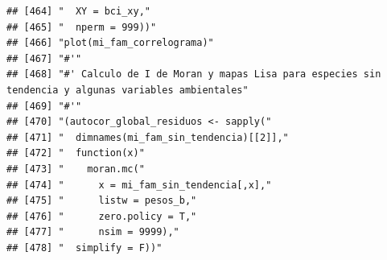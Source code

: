 \documentclass[11pt,]{article}
\begin{document}
\begin{verbatim}
## [464] "  XY = bci_xy,"                                                                                                                                                        
## [465] "  nperm = 999))"                                                                                                                                                       
## [466] "plot(mi_fam_correlograma)"                                                                                                                                             
## [467] "#'"                                                                                                                                                                    
## [468] "#' Calculo de I de Moran y mapas Lisa para especies sin tendencia y algunas variables ambientales"                                                                     
## [469] "#'"                                                                                                                                                                    
## [470] "(autocor_global_residuos <- sapply("                                                                                                                                   
## [471] "  dimnames(mi_fam_sin_tendencia)[[2]],"                                                                                                                                
## [472] "  function(x)"                                                                                                                                                         
## [473] "    moran.mc("                                                                                                                                                         
## [474] "      x = mi_fam_sin_tendencia[,x],"                                                                                                                                   
## [475] "      listw = pesos_b,"                                                                                                                                                
## [476] "      zero.policy = T,"                                                                                                                                                
## [477] "      nsim = 9999),"                                                                                                                                                   
## [478] "  simplify = F))"                                                                                                                                                      

\end{verbatim}
\end{document}
